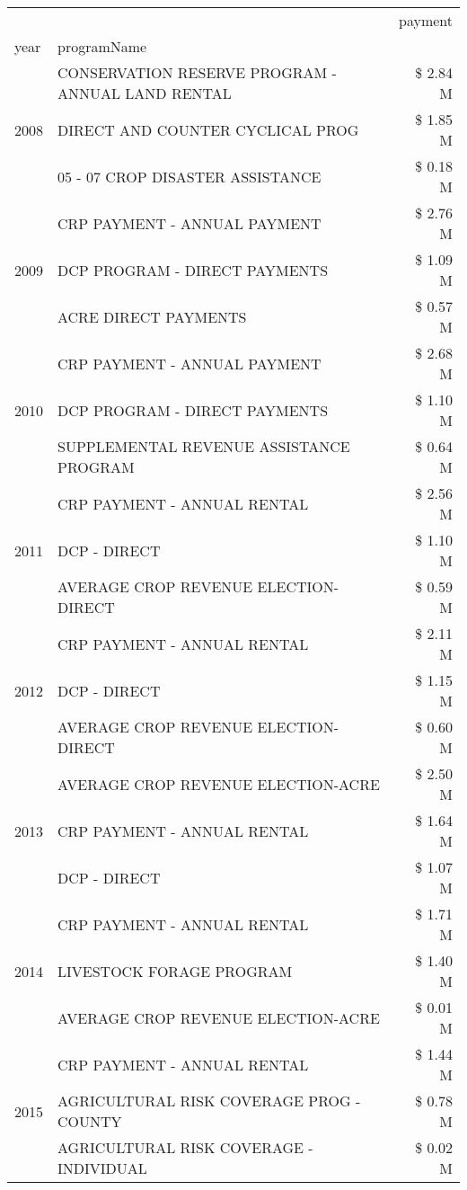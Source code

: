 \begin{tabular}{llr}
\toprule
 &  & payment \\
year & programName &  \\
\midrule
\multirow[t]{3}{*}{2008} & CONSERVATION RESERVE PROGRAM - ANNUAL LAND RENTAL & \$ 2.84 M \\
 & DIRECT AND COUNTER CYCLICAL PROG & \$ 1.85 M \\
 & 05 - 07 CROP DISASTER ASSISTANCE & \$ 0.18 M \\
\cline{1-3}
\multirow[t]{3}{*}{2009} & CRP PAYMENT - ANNUAL PAYMENT & \$ 2.76 M \\
 & DCP PROGRAM - DIRECT PAYMENTS & \$ 1.09 M \\
 & ACRE DIRECT PAYMENTS & \$ 0.57 M \\
\cline{1-3}
\multirow[t]{3}{*}{2010} & CRP PAYMENT - ANNUAL PAYMENT & \$ 2.68 M \\
 & DCP PROGRAM - DIRECT PAYMENTS & \$ 1.10 M \\
 & SUPPLEMENTAL REVENUE ASSISTANCE PROGRAM & \$ 0.64 M \\
\cline{1-3}
\multirow[t]{3}{*}{2011} & CRP PAYMENT - ANNUAL RENTAL & \$ 2.56 M \\
 & DCP - DIRECT & \$ 1.10 M \\
 & AVERAGE CROP REVENUE ELECTION-DIRECT & \$ 0.59 M \\
\cline{1-3}
\multirow[t]{3}{*}{2012} & CRP PAYMENT - ANNUAL RENTAL & \$ 2.11 M \\
 & DCP - DIRECT & \$ 1.15 M \\
 & AVERAGE CROP REVENUE ELECTION-DIRECT & \$ 0.60 M \\
\cline{1-3}
\multirow[t]{3}{*}{2013} & AVERAGE CROP REVENUE ELECTION-ACRE & \$ 2.50 M \\
 & CRP PAYMENT - ANNUAL RENTAL & \$ 1.64 M \\
 & DCP - DIRECT & \$ 1.07 M \\
\cline{1-3}
\multirow[t]{3}{*}{2014} & CRP PAYMENT - ANNUAL RENTAL & \$ 1.71 M \\
 & LIVESTOCK FORAGE PROGRAM & \$ 1.40 M \\
 & AVERAGE CROP REVENUE ELECTION-ACRE & \$ 0.01 M \\
\cline{1-3}
\multirow[t]{3}{*}{2015} & CRP PAYMENT - ANNUAL RENTAL & \$ 1.44 M \\
 & AGRICULTURAL RISK COVERAGE PROG - COUNTY & \$ 0.78 M \\
 & AGRICULTURAL RISK COVERAGE - INDIVIDUAL & \$ 0.02 M \\
\cline{1-3}

\end{tabular}
